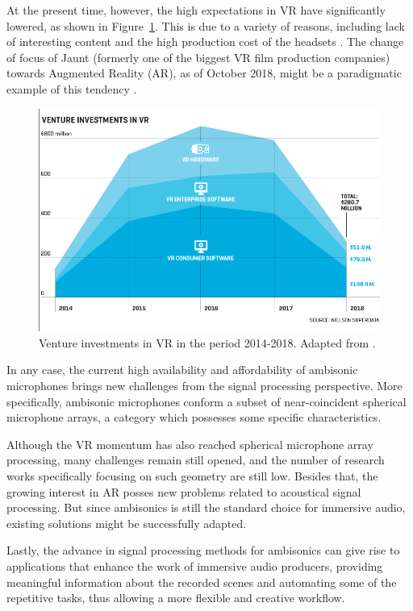 At the present time, however, the high expectations in VR have significantly lowered, as shown in Figure~\ref{fig:vrfunding}. This is due to a variety of reasons, including lack of interesting content and the high production cost of the headsets \cite{fortune}. The change of focus of Jaunt (formerly one of the biggest VR film production companies) towards Augmented Reality (AR), as of October 2018, might be a paradigmatic example of this tendency \cite{theverge}. 

\begin{figure}[t!]
  \includegraphics[width=\textwidth]{Figures/Introduction/vr_funding.png}
  \caption{Venture investments in VR in the period 2014-2018. Adapted from \cite{fortune}.}
  \label{fig:vrfunding}
\end{figure}



In any case, the current high availability and affordability of ambisonic microphones brings new challenges from the signal processing perspective. More specifically, ambisonic microphones conform a subset of near-coincident spherical microphone arrays, a category which possesses some specific characteristics.

Although the VR momentum has also reached spherical microphone array processing, many challenges remain still opened, and the number of research works specifically focusing on such geometry are still low. 
Besides that, the growing interest in AR posses new problems related to acoustical signal processing. But since ambisonics is still the standard choice for immersive audio, existing solutions might be successfully adapted. 

Lastly, the advance in signal processing methods for ambisonics can give rise to applications that enhance the work of immersive audio producers, providing meaningful information about the recorded scenes and automating some of the repetitive tasks, thus allowing a more flexible and creative workflow.










